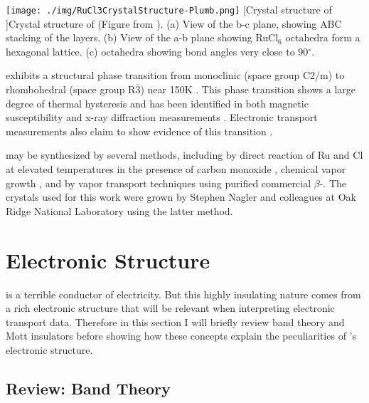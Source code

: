 \begin{centering}
\texttt{[image: ./img/RuCl3CrystalStructure-Plumb.png]}
  \captionsetup{width=0.75\textwidth}
  [Crystal structure of \ruclnospace]{Crystal structure of \rucl (Figure from \cite{Plumb2014}). (a) View of the b-c plane, showing ABC stacking of the layers. (b) View of the a-b plane showing RuCl$_{6}$ octahedra form a hexagonal lattice. (c) \rucl octahedra showing bond angles very close to 90$^{\circ}$.} 
  \label{fig:RuCl3CrystStruct-1}
\end{centering}

\rucl exhibits a structural phase transition from monoclinic (space group C2/m) to rhombohedral (space group R$\overline{3}$) near 150K \cite{Glamazda2017}. This phase transition shows a large degree of thermal hysteresis and has been identified in both magnetic susceptibility and x-ray diffraction measurements \cite{Park2016}. Electronic transport measurements also claim to show evidence of this transition \cite{Mashhadi2018}.

\rucl may be synthesized by several methods, including by direct reaction of Ru and Cl at elevated temperatures in the presence of carbon monoxide \cite{Binotto1971}, chemical vapor growth \cite{Gronke2018}, and by vapor transport techniques using purified commercial $\beta$-\ruclnospace \cite{Cao2016}. The \rucl crystals used for this work were grown by Stephen Nagler and colleagues at Oak Ridge National Laboratory using the latter method.

\section{Electronic Structure}

\rucl is a terrible conductor of electricity. But this highly insulating nature comes from a rich electronic structure that will be relevant when interpreting electronic transport data. Therefore in this section I will briefly review band theory and Mott insulators before showing how these concepts explain the peculiarities of \ruclnospace 's electronic structure.

\subsection{Review: Band Theory}

